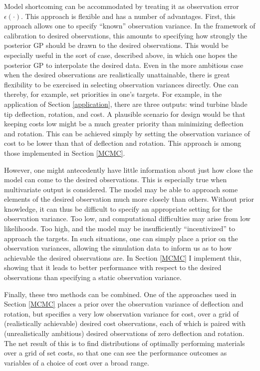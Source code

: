 \documentclass{article}
\begin{document}

Model shortcoming can be accommodated by treating it as observation error $\epsilon(\cdot)$. This approach is flexible and has a number of advantages.
First, this approach allows one to specify ``known'' observation variance. In the framework of calibration to desired observations, this amounts to specifying how strongly the posterior GP should be drawn to the desired observations. This would be especially useful in the sort of case, described above, in which one hopes the posterior GP to interpolate the desired data. Even in the more ambitious case when the desired observations are realistically unattainable, there is great flexibility to be exercised in selecting observation variances directly. One can thereby, for example, set priorities in one's targets. For example, in the application of Section \ref{application}, there are three outputs: wind turbine blade tip deflection, rotation, and cost. A plausible scenario for design would be that keeping costs low might be a much greater priority than minimizing deflection and rotation. This can be achieved simply by setting the observation variance of cost to be lower than that of deflection and rotation. 
This approach is among those implemented in Section \ref{MCMC}.

However, one might antecedently have little information about just how close the model can come to the desired observations. This is especially true when multivariate output is considered. The model may be able to approach some elements of the desired observation much more closely than others. Without prior knowledge, it can thus be difficult to specify an appropriate setting for the observation variance. Too low, and computational difficulties may arise from low likelihoods. Too high, and the model may be insufficiently ``incentivized'' to approach the targets. In such situations, one can simply place a prior on the observation variances, allowing the simulation data to inform us as to how achievable the desired observations are. In Section \ref{MCMC} I implement this, showing that it leads to better performance with respect to the desired observations than specifying a static observation variance.

Finally, these two methods can be combined. One of the approaches used in Section \ref{MCMC} places a prior over the observation variance of deflection and rotation, but specifies a very low observation variance for cost, over a grid of (realistically achievable) desired cost observations, each of which is paired with (unrealistically ambitious) desired observations of zero deflection and rotation. The net result of this is to find distributions of optimally performing materials over a grid of set costs, so that one can see the performance outcomes as variables of a choice of cost over a broad range.
\end{document}
